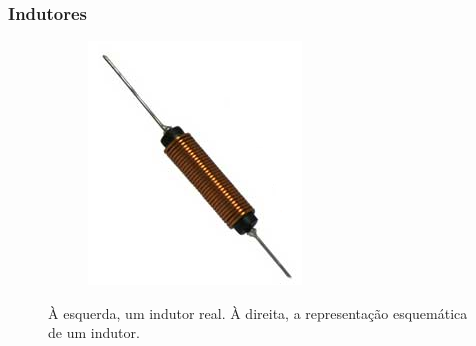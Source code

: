 \subsubsection*{Indutores}

\begin{figure}
    \centering
    \begin{subfigure}[b]{0.3\textwidth}
        \centering
        \includegraphics[width=\textwidth]{anexos/indutor.png}
    \end{subfigure}
    \hspace{1cm}
    \begin{subfigure}[b]{0.3\textwidth}
        \centering
    \end{subfigure}
    \caption{À esquerda, um indutor real. À direita, a representação esquemática de um indutor.}
    \label{fig:three graphs}
\end{figure}


